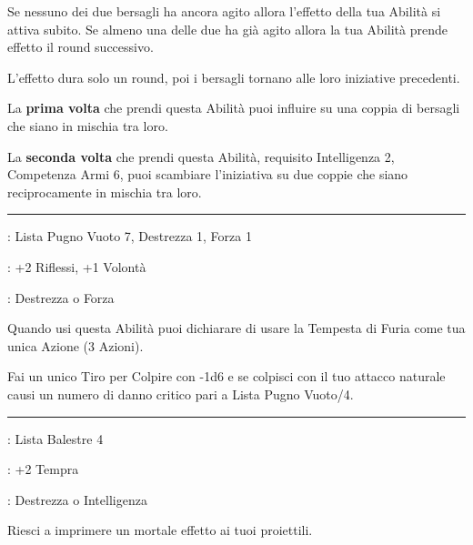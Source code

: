 \begin{multicols}{2}
Se nessuno dei due bersagli ha ancora agito allora l'effetto della tua Abilità si attiva subito. Se almeno una delle due ha già agito allora la tua Abilità prende effetto il round successivo.

L'effetto dura solo un round, poi i bersagli tornano alle loro iniziative precedenti.

La \textbf{prima volta} che prendi questa Abilità puoi influire su una coppia di bersagli che siano in mischia tra loro.

La \textbf{seconda volta} che prendi questa Abilità, requisito Intelligenza 2, Competenza Armi 6, puoi scambiare l'iniziativa su due coppie che siano reciprocamente in mischia tra loro.

\smallskip\noindent\rule{\linewidth}{2pt} \hypertarget{Tempesta di Furia}{}\medskip{}
\noindent
\begin{description}[noitemsep, topsep=0pt, parsep=0pt, partopsep=0pt, leftmargin=0cm, labelwidth=2.5cm]
    \item[\textbf{Requisito}]: Lista Pugno Vuoto 7, Destrezza 1, Forza 1
    \item[\textbf{Tiri Salvezza}]: +2 Riflessi, +1 Volontà
    \item[\textbf{Caratteristica}]: Destrezza o Forza
\end{description}

Quando usi questa Abilità puoi dichiarare di usare la Tempesta di Furia come tua unica Azione (3 Azioni).

Fai un unico Tiro per Colpire con -1d6 e se colpisci con il tuo attacco naturale causi un numero di danno critico pari a Lista Pugno Vuoto/4.

\smallskip\noindent\rule{\linewidth}{2pt} \hypertarget{Testa cava}{}\medskip{}
\noindent
\begin{description}[noitemsep, topsep=0pt, parsep=0pt, partopsep=0pt, leftmargin=0cm, labelwidth=2.5cm]
    \item[\textbf{Requisito}]: Lista Balestre 4
    \item[\textbf{Tiri Salvezza}]: +2 Tempra
    \item[\textbf{Caratteristica}]: Destrezza o Intelligenza
\end{description}

Riesci a imprimere un mortale effetto ai tuoi proiettili.


\end{multicols}
